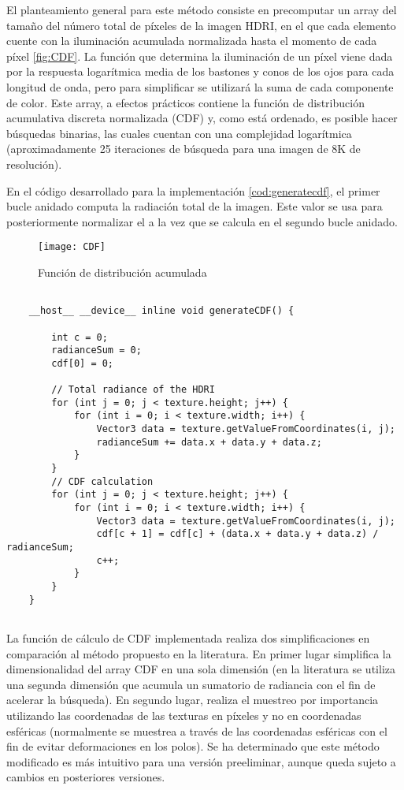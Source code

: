 El planteamiento general para este método consiste en precomputar un array del tamaño del número total de píxeles de la imagen HDRI, en el que cada elemento cuente con la iluminación acumulada normalizada hasta el momento de cada píxel \autoref{fig:CDF}.
La función que determina la iluminación de un píxel viene dada por la respuesta logarítmica media de los bastones y conos de los ojos para cada longitud de onda, pero para simplificar se utilizará la suma de cada componente de color. Este array, a efectos prácticos contiene la función de distribución acumulativa discreta normalizada (CDF) y, como está ordenado, es posible hacer búsquedas binarias, las cuales cuentan con una complejidad logarítmica (aproximadamente 25 iteraciones de búsqueda para una imagen de 8K de resolución).

En el código desarrollado para la implementación \autoref{cod:generatecdf}, el primer bucle anidado computa la radiación total de la imagen. Este valor se usa para posteriormente normalizar el  a la vez que se calcula en el segundo bucle anidado.


\begin{figure}[H]
    \centering
	\texttt{[image: CDF]}
	\caption{Función de distribución acumulada}
	\label{fig:CDF}
\end{figure}

\begin{minipage}[c]{0.95\textwidth}
\begin{lstlisting}[label={cod:generatecdf}, caption={Generación de la función de distribución acumulada}]
	
	__host__ __device__ inline void generateCDF() {

		int c = 0;
		radianceSum = 0;
		cdf[0] = 0;

		// Total radiance of the HDRI
		for (int j = 0; j < texture.height; j++) {
			for (int i = 0; i < texture.width; i++) {
				Vector3 data = texture.getValueFromCoordinates(i, j);
				radianceSum += data.x + data.y + data.z;
			}
		}
		// CDF calculation
		for (int j = 0; j < texture.height; j++) {
			for (int i = 0; i < texture.width; i++) {
				Vector3 data = texture.getValueFromCoordinates(i, j);
				cdf[c + 1] = cdf[c] + (data.x + data.y + data.z) / radianceSum;
				c++;
			}
		}
	}
	
\end{lstlisting}
\end{minipage}

La función de cálculo de CDF implementada realiza dos simplificaciones en comparación al método propuesto en la literatura. En primer lugar simplifica la dimensionalidad del array CDF en una sola dimensión (en la literatura se utiliza una segunda dimensión que acumula un sumatorio de radiancia con el fin de acelerar la búsqueda). En segundo lugar, realiza el muestreo por importancia utilizando las coordenadas de las texturas en píxeles y no en coordenadas esféricas (normalmente se muestrea a través de las coordenadas esféricas con el fin de evitar deformaciones en los polos). Se ha determinado que este método modificado es más intuitivo para una versión preeliminar, aunque queda sujeto a cambios en posteriores versiones. 


